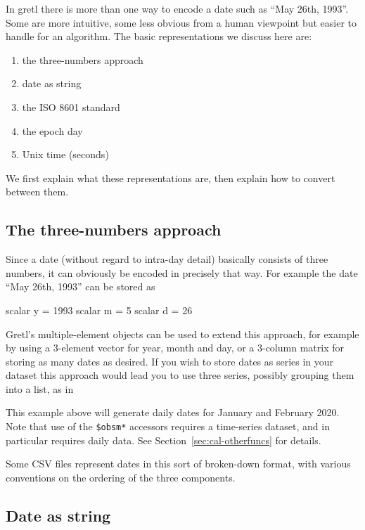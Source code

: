 In gretl there is more than one way to encode a date such as ``May
26th, 1993''. Some are more intuitive, some less obvious from a human
viewpoint but easier to handle for an algorithm. The basic
representations we discuss here are:
\begin{enumerate}
\item the three-numbers approach
\item date as string
\item the ISO 8601 standard
\item the epoch day
\item Unix time (seconds)
\end{enumerate}
We first explain what these representations are, then explain how
to convert between them.

\subsection{The three-numbers approach}
\label{sec:cal-3numbers}

Since a date (without regard to intra-day detail) basically consists
of three numbers, it can obviously be encoded in precisely that way.
For example the date ``May 26th, 1993'' can be stored as
\begin{code}
  scalar y = 1993
  scalar m = 5
  scalar d = 26
\end{code}

Gretl's multiple-element objects can be used to extend this approach,
for example by using a 3-element vector for year, month and day, or a
3-column matrix for storing as many dates as desired. If you wish to
store dates as series in your dataset this approach would lead you to
use three series, possibly grouping them into a list, as in
This example above will generate daily dates for January and February
2020. Note that use of the \verb|$obsm*| accessors requires a
time-series dataset, and  in particular requires
daily data. See Section~\ref{sec:cal-otherfuncs} for details.

Some CSV files represent dates in this sort of broken-down format,
with various conventions on the ordering of the three components.

\subsection{Date as string}
\label{sec:cal-generic-string}

